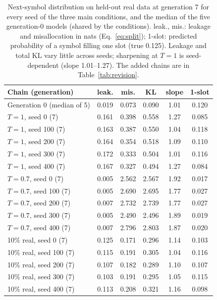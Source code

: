 \documentclass[10pt,letterpaper]{article}
\begin{document}
\begin{table}[H]
\centering
\caption{ Next-symbol distribution on held-out real data at generation 7 for every seed of the three main conditions, and the median of the five generation-0 models (shared by the conditions). leak., mis.: leakage and misallocation in nats (Eq.~\ref{eq:split}); 1-slot: predicted probability of a symbol filling one slot (true 0.125). Leakage and total KL vary little across seeds; sharpening at $T{=}1$ is seed-dependent (slope 1.01--1.27). The added chains are in Table~\ref{tab:revision}.}
\small
\begin{tabular}{@{}lccccc@{}}
\toprule
Chain (generation) & leak. & mis. & KL & slope & 1-slot \\
\midrule
Generation 0 (median of 5) & 0.019 & 0.073 & 0.090 & 1.01 & 0.120 \\
\midrule
$T{=}1$, seed 0 (7) & 0.161 & 0.398 & 0.558 & 1.27 & 0.085 \\
$T{=}1$, seed 100 (7) & 0.163 & 0.387 & 0.550 & 1.04 & 0.118 \\
$T{=}1$, seed 200 (7) & 0.164 & 0.354 & 0.518 & 1.09 & 0.110 \\
$T{=}1$, seed 300 (7) & 0.172 & 0.333 & 0.504 & 1.01 & 0.116 \\
$T{=}1$, seed 400 (7) & 0.167 & 0.327 & 0.494 & 1.27 & 0.084 \\
\midrule
$T{=}0.7$, seed 0 (7) & 0.005 & 2.562 & 2.567 & 1.92 & 0.017 \\
$T{=}0.7$, seed 100 (7) & 0.005 & 2.690 & 2.695 & 1.77 & 0.027 \\
$T{=}0.7$, seed 200 (7) & 0.007 & 2.732 & 2.739 & 1.77 & 0.027 \\
$T{=}0.7$, seed 300 (7) & 0.005 & 2.490 & 2.496 & 1.89 & 0.019 \\
$T{=}0.7$, seed 400 (7) & 0.007 & 2.796 & 2.803 & 1.87 & 0.020 \\
\midrule
10\% real, seed 0 (7) & 0.125 & 0.171 & 0.296 & 1.14 & 0.103 \\
10\% real, seed 100 (7) & 0.115 & 0.191 & 0.305 & 1.04 & 0.116 \\
10\% real, seed 200 (7) & 0.107 & 0.182 & 0.289 & 1.10 & 0.107 \\
10\% real, seed 300 (7) & 0.103 & 0.191 & 0.295 & 1.05 & 0.115 \\
10\% real, seed 400 (7) & 0.113 & 0.208 & 0.321 & 1.16 & 0.098 \\
\bottomrule
\end{tabular}
\label{tab:collapse}
\end{table}
\end{document}
